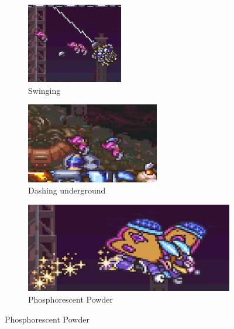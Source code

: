 \begin{figure}[htp]
	\centering
	\begin{subfigure}{0.4\linewidth}
		\centering
		\includegraphics[height=3.5cm]{figures/X2/Morph_moth/Moth_swing.jpg}
		\caption{Swinging}
	\end{subfigure}
	\begin{subfigure}{0.5\linewidth}
		\centering
		\includegraphics[height=3.5cm]{figures/X2/Morph_moth/Moth_underground.jpg}
		\caption{Dashing underground}
	\end{subfigure}
	\begin{subfigure}{0.4\linewidth}
		\centering
		\includegraphics[width=\linewidth]{figures/X2/Morph_moth/Moth_powder.jpg}
		\caption{Phosphorescent Powder}
	\end{subfigure}
\end{figure}
